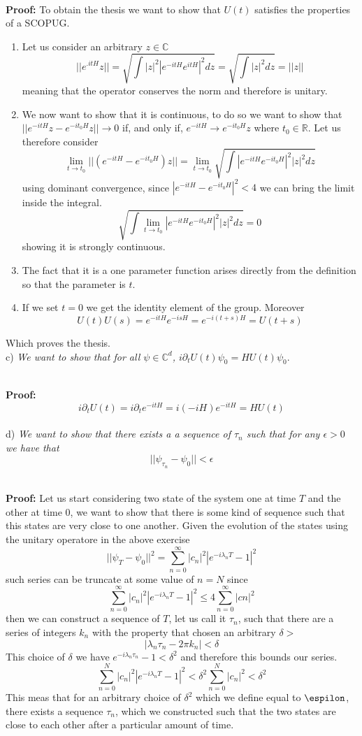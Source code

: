 \documentclass{article}
\newcommand{\R}{\mathbb{R}}
\newcommand{\C}{\mathbb{C}}
\newcommand{\ex}{\textit}
\newcommand{\proof}{\\ \textbf{Proof: }}
\begin{document}
\proof To obtain the thesis we want to show that $U(t)$ satisfies the properties of a SCOPUG.
\begin{enumerate} [label = \roman*)]
    \item Let us consider an arbitrary $z \in \C$
    \[
        ||e^{.itH}z|| = \sqrt{\int |z|^2 \left| e^{-itH} e^{itH} \right|^2 dz} = \sqrt{\int |z|^2 dz} = ||z||
    \]
    meaning that the operator conserves the norm and therefore is unitary.
    \item We now want to show that it is continuous, to do so we want to show that $||e^{-itH}z - e^{-it_0H}z|| \to 0$ if, and only if, $e^{-itH} \to e^{-it_0H}z$ where $t_0 \in \R$. Let us therefore consider
    \[
        \lim_{t \to t_0}||(e^{-itH} - e^{-it_0H})z||  = \lim_{t \to t_0} \sqrt{\int |e^{-itH} e^{-it_0H}|^2 |z|^2 dz }
    \]
    using dominant convergence, since $|e^{-itH} -e^{-it_0H}|^2<4$ we can bring the limit inside the integral.
    \[
        \sqrt{\int \lim_{t \to t_0} |e^{-itH} e^{-it_0H}|^2 |z|^2 dz } = 0
    \]
    showing it is strongly continuous.
    \item The fact that it is a one parameter function arises directly from the definition so that the parameter is $t$.
    \item If we set $t = 0$  we get the identity element of the group. Moreover
    \[
        U(t) U(s) =  e^{-itH} e^{-isH} = e^{-i(t+s)H} = U(t+s)
    \]
\end{enumerate}
Which proves the thesis.\\
c) \ex{We want to show that for all $\psi \in \C^d$, $i \partial_t U(t) \psi_0 = H U(t) \psi_0$}.

\proof 
\[
     i \partial_t  U(t) = i \partial_t e^{-itH} = i(-iH)e^{-itH} = H U(t)
\]
\\
d) \ex{We want to show that there exists a a sequence of $\tau_n$ such that for any $\epsilon > 0$ we have that}
\[
    ||\psi_{\tau_n} - \psi_0 || < \epsilon
\]

\proof Let us start considering two state of the system one at time $T$ and the other at time $0$, we want to show that there is some kind of sequence such that this states are very close to one another. Given the evolution of the states using the unitary operatore in the above exercise
\[
    || \psi_T - \psi_0||^2 = \sum_{n=0}^\infty |c_n|^2 |e^{-i\lambda_n T} - 1|^2
\]
such series can be truncate at some value of $n = N$ since 
\[
    \sum_{n=0}^\infty |c_n|^2 |e^{-i\lambda_n T} - 1|^2 \leq 4 \sum_{n = 0}^\infty |cn|^2
\]
then we can construct a sequence of $T$, let us call it $\tau_n$, such that there are a series of integers $k_n$ with the property that chosen an arbitrary $\delta>$
\[
    |\lambda_n \tau_n - 2\pi k_n|<\delta
\]
This choice of $\delta$ we have $e^{-i\lambda_n \tau_n} -1 < \delta^2$ and therefore this bounds our series.
\[
    \sum_{n=0}^N |c_n|^2 |e^{-i\lambda_n T}- 1|^2 < \delta^2 \sum_{n=0}^N |c_n|^2 < \delta^2
\]
This meas that for an arbitrary choice of $\delta^2$ which we define equal to $\espilon$, there exists a sequence $\tau_n$, which we constructed such that the two states are close to each other after a particular amount of time.
\end{document}
